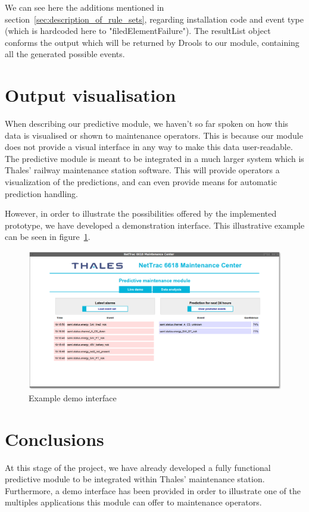 \documentclass[a4paper,12pt]{article}
\begin{document}
We can see here the additions mentioned in section~\ref{sec:description_of_rule_sets}, regarding installation code and event type (which is hardcoded here to "filedElementFailure"). The resultList object conforms the output which will be returned by Drools to our module, containing all the generated possible events.

\section{Output visualisation}
When describing our predictive module, we haven't so far spoken on how this data is visualised or shown to maintenance operators. This is because our module does not provide a visual interface in any way to make this data user-readable. The predictive module is meant to be integrated in a much larger system which is Thales' railway maintenance station software. This will provide operators a visualization of the predictions, and can even provide means for automatic prediction handling.

However, in order to illustrate the possibilities offered by the implemented prototype, we have developed a demonstration interface. This illustrative example can be seen in figure~\ref{fig:demoExample}.

\begin{figure}[hbtp]
\includegraphics[width=\textwidth]{img/demoExample.png}
\caption{Example demo interface} \label{fig:demoExample}
\end{figure}

\clearpage

\section{Conclusions}
At this stage of the project, we have already developed a fully functional predictive module to be integrated within Thales' maintenance station. Furthermore, a demo interface has been provided in order to illustrate one of the multiples applications this module can offer to maintenance operators.
\end{document}
